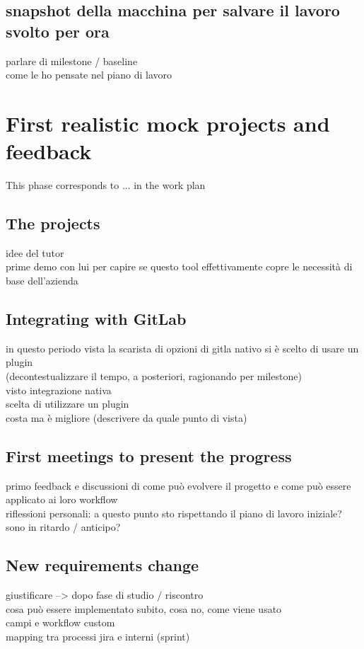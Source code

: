 	\subsection{snapshot della macchina per salvare il lavoro svolto per ora}
		parlare di milestone / baseline\\
		come le ho pensate nel piano di lavoro

\section{First realistic mock projects and feedback}

	This phase corresponds to ... in the work plan

	\subsection{The projects}
		idee del tutor\\
		prime demo con lui per capire se questo tool effettivamente copre le necessità di base dell'azienda
		
	\subsection{Integrating with GitLab}
		in questo periodo vista la scarista di opzioni di gitla nativo si è scelto di usare un plugin\\
		(decontestualizzare il tempo, a posteriori, ragionando per milestone)\\
		visto integrazione nativa\\
		scelta di utilizzare un plugin\\
		costa ma è migliore (descrivere da quale punto di vista)
	
	\subsection{First meetings to present the progress}
		primo feedback e discussioni di come può evolvere il progetto e come può essere applicato ai loro workflow\\
		riflessioni personali: a questo punto sto rispettando il piano di lavoro iniziale? sono in ritardo / anticipo?
	
	\subsection{New requirements change}
		giustificare --> dopo fase di studio / riscontro\\
		cosa può essere implementato subito, cosa no, come viene usato\\
		campi e workflow custom\\
		mapping tra processi jira e interni (sprint)
	
